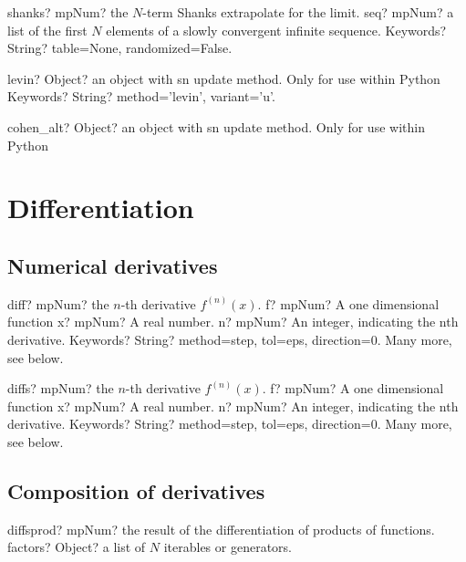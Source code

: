 \documentclass[12pt,a4paper,openany]{book}
\begin{document}
\begin{mpFunctionsExtract}
\mpFunctionTwo
{shanks? mpNum? the $N$-term Shanks extrapolate for the limit.}
{seq? mpNum? a list of the first $N$ elements of a slowly convergent infinite sequence.}
{Keywords? String? table=None, randomized=False.}
\end{mpFunctionsExtract}

\begin{mpFunctionsExtract}
\mpFunctionOne
{levin? Object? an object with sn update method. Only for use within Python}
{Keywords? String? method='levin', variant='u'.}
\end{mpFunctionsExtract}

\begin{mpFunctionsExtract}
\mpFunctionZero
{cohen\_alt? Object? an object with sn update method. Only for use within Python}
\end{mpFunctionsExtract}

\chapter{Differentiation}

\section{Numerical derivatives}

\begin{mpFunctionsExtract}
\mpFunctionFour
{diff? mpNum? the $n$-th derivative $f^{(n)}(x)$.}
{f? mpNum? A one dimensional function}
{x? mpNum? A real number.}
{n? mpNum? An integer, indicating the nth derivative.}
{Keywords? String? method=step, tol=eps, direction=0. Many more, see below.}
\end{mpFunctionsExtract}

\begin{mpFunctionsExtract}
\mpFunctionFour
{diffs? mpNum? the $n$-th derivative $f^{(n)}(x)$.}
{f? mpNum? A one dimensional function}
{x? mpNum? A real number.}
{n? mpNum? An integer, indicating the nth derivative.}
{Keywords? String? method=step, tol=eps, direction=0. Many more, see below.}
\end{mpFunctionsExtract}

\section{Composition of derivatives}

\begin{mpFunctionsExtract}
\mpFunctionOne
{diffsprod? mpNum? the result of the differentiation of products of functions.}
{factors? Object? a list of $N$ iterables or generators.}
\end{mpFunctionsExtract}
\end{document}
